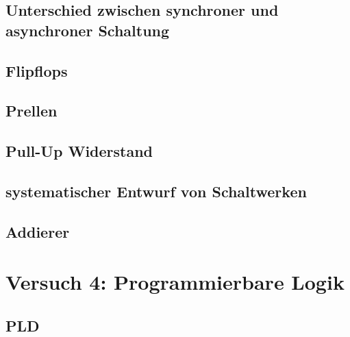 \documentclass[paper=a4, fontsize=11pt]{scrartcl}
\numberwithin{equation}{section}
\numberwithin{figure}{section}
\numberwithin{table}{section}
\begin{document}
\subsection{Unterschied zwischen synchroner und asynchroner Schaltung}



\subsection{Flipflops}


\subsection{Prellen}


\subsection{Pull-Up Widerstand}


\subsection{systematischer Entwurf von Schaltwerken}


\subsection{Addierer}


\newpage

\section{Versuch 4: Programmierbare Logik}


\subsection{PLD}
\end{document}
